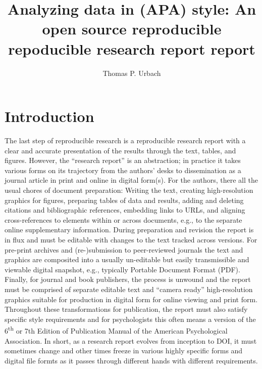 \documentclass[helv,10pt,man,floatsintext]{apa6}  %
\title{Analyzing data in (APA) style: An open source
  reproducible repoducible research report report}
\author{Thomas P. Urbach}
\affiliation{
  Cognitive Science Department \\
  University of California, San Diego \\
  \today
}
\begin{document}
\maketitle

\section{Introduction}

The last step of reproducible research is a reproducible research
report with a clear and accurate presentation of the results through
the text, tables, and figures.  However, the ``research report'' is an
abstraction; in practice it takes various forms on its trajectory from
the authors' desks to dissemination as a journal article in print and
online in digital form(s). For the authors, there all the usual chores
of document preparation: Writing the text, creating high-resolution
graphics for figures, preparing tables of data and results, adding and
deleting citations and bibliographic references, embedding links to
URLs, and aligning cross-references to elements within or across
documents, e.g., to the separate online supplementary
information. During preparation and revision the report is in flux and
must be editable with changes to the text tracked across versions.
For pre-print archives and (re-)submission to peer-reviewed journals
the text and graphics are composited into a usually un-editable but
easily transmissible and viewable digital snapshot, e.g., typically
Portable Document Format (PDF). Finally, for journal and book
publishers, the process is unwound and the report must be comprised of
separate editable text and ``camera ready'' high-resolution graphics
suitable for production in digital form for online viewing and print
form. Throughout these transformations for publication, the report
must also satisfy specific style requirements and for psychologists
this often means a version of the 6\textsuperscript{th} or 7th Edition
of Publication Manual of the American Psychological Association. In
short, as a research report evolves from inception to DOI, it must
sometimes change and other times freeze in various highly specific
forms and digital file formts as it passes through different hands
with different requirements.
\end{document}
